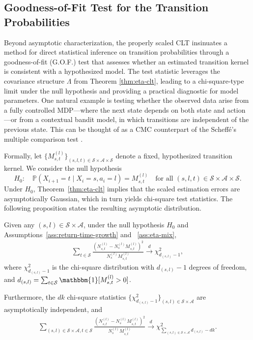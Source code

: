 \documentclass[twoside,11pt]{article}
\newcommand{\pow}[1]{^{(#1)}}%
\numberwithin{equation}{section}
\newcommand{\lp}{\left(}
\newcommand{\rp}{\right)}
\newcommand{\indicator}{\mathbbm{1}}
\begin{document}
\subsection{Goodness-of-Fit Test for the Transition Probabilities}
Beyond asymptotic characterization, the properly scaled CLT insinuates a method for direct statistical inference on transition probabilities through a goodness-of-fit (G.O.F.) test that assesses whether an estimated transition kernel is consistent with a hypothesized model. 
The test statistic leverages the covariance structure $\Lambda$ from Theorem \ref{thm:eta-clt}, leading to a chi-square-type limit under the null hypothesis and providing a practical diagnostic for model parameters.
One natural example is testing whether the observed data arise from a fully controlled MDP---where the next state depends on both state and action---or from a contextual bandit model, in which transitions are independent of the previous state.
This can be thought of as a CMC counterpart of the Scheffé's multiple comparison test \citep{scheffe1953method}. 

Formally, let $\{M \pow l_{s,t}\}_{(s,l,t)\in\mathcal S\times\mathcal A\times\mathcal S}$ denote a fixed, hypothesized transition kernel.
We consider the null hypothesis
\[
H_0:\quad \mathbb{P}(X_{i+1}=t \mid X_i=s, a_i=l) = M^{(l)}_{s,t}
\quad \text{for all } (s,l,t)\in\mathcal S\times\mathcal A\times\mathcal S.
\]
Under $H_0$, Theorem~\ref{thm:eta-clt} implies that the scaled estimation errors are asymptotically Gaussian, which in turn yields chi-square test statistics.
The following proposition states the resulting asymptotic distribution.

\begin{proposition}\label{prop:gof}
Given any $(s,l) \in \mathcal{S}\times\mathcal{A}$, under the null hypothesis $H_0$ and Assumptions~\ref{ass:return-time-growth} and ~\ref{ass:eta-mix},
\begin{align*}
    \sum_{t \in \mathcal S} \frac{\lp N_{s,t} \pow l - N_s \pow l M_{s,t} \pow l \rp^2}{N_s \pow l M_{s,t} \pow l}\overset{d}{\rightarrow} \chi^2_{d_{(s,l)} - 1},
\end{align*}
where $\chi^2_{d_{(s,l)} - 1}$ is the chi-square distribution with $d_{(s,l)} - 1$ degrees of freedom, and $d_{(s,l)}=\sum_{t\in\mathcal S}\indicator [M_{s,t} \pow l > 0]$.

Furthermore, the $dk$ chi-square statistics $\{\chi^2_{d_{(s,l)} - 1}\}_{(s,l) \in \mathcal{S} \times\mathcal{A}}$ are asymptotically independent, and 
\begin{align}
\label{eq:GOF}
    \sum_{(s, l) \in \mathcal S \times \mathcal A, t \in \mathcal S} \frac{\lp N_{s,t} \pow l - N_s \pow l M_{s,t} \pow l \rp^2}{N_s \pow l M_{s,t} \pow l} \overset{d}{\rightarrow} \chi^2_{\sum_{(s,l) \in \mathcal S \times \mathcal A} d_{(s,l)} - dk}.
\end{align}
\end{proposition}
\end{document}

